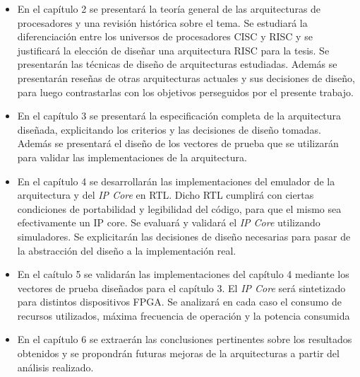 \begin{itemize}
\item En el capítulo 2 se presentará la teoría general de las arquitecturas de
  procesadores y una revisión histórica sobre el tema. Se estudiará la
  diferenciación entre los universos de procesadores CISC y RISC y se
  justificará la elección de diseñar una arquitectura RISC para la tesis. Se
  presentarán las técnicas de diseño de arquitecturas estudiadas. Además se
  presentarán reseñas de otras arquitecturas actuales y sus decisiones de
  diseño, para luego contrastarlas con los objetivos perseguidos por el
  presente trabajo.
\item En el capítulo 3 se presentará la especificación completa de la
  arquitectura diseñada, explicitando los criterios y las decisiones de diseño
  tomadas. Además se presentará el diseño de los vectores de prueba que se
  utilizarán para validar las implementaciones de la arquitectura.
\item En el capítulo 4 se desarrollarán las implementaciones del emulador de la
  arquitectura y del \emph{IP Core} en RTL. Dicho RTL cumplirá con ciertas
  condiciones de portabilidad y legibilidad del código, para que el mismo sea
  efectivamente un IP core. Se evaluará y validará el \emph{IP Core}
  utilizando simuladores. Se explicitarán las decisiones de diseño necesarias
  para pasar de la abstracción del diseño a la implementación real.
\item En el caítulo 5 se validarán las implementaciones del capítulo 4 mediante
  los vectores de prueba diseñados para el capítulo 3. El \emph{IP Core} será
  sintetizado para distintos dispositivos FPGA. Se analizará en cada caso el
  consumo de recursos utilizados, máxima frecuencia de operación y la potencia
  consumida
\item En el capítulo 6 se extraerán las conclusiones pertinentes sobre los
  resultados obtenidos y se propondrán futuras mejoras de la arquitecturas a
  partir del análisis realizado.
\end{itemize}
